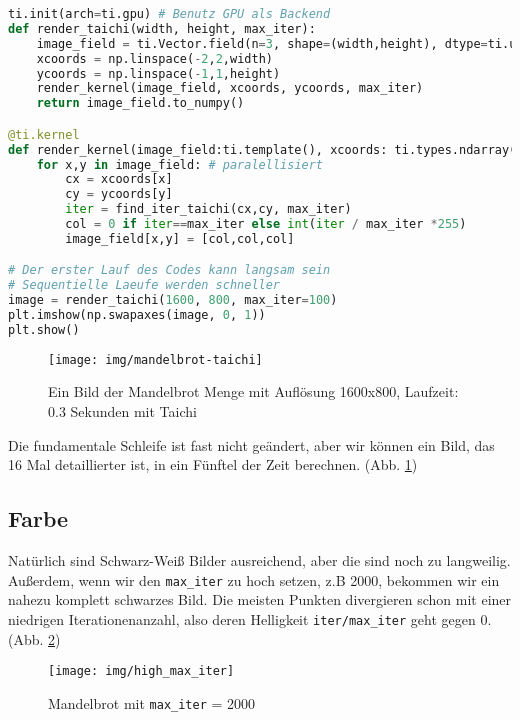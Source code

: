 \documentclass{article}
\begin{document}
\begin{lstlisting}[language=python]
ti.init(arch=ti.gpu) # Benutz GPU als Backend
def render_taichi(width, height, max_iter):
	image_field = ti.Vector.field(n=3, shape=(width,height), dtype=ti.uint32)
	xcoords = np.linspace(-2,2,width)
	ycoords = np.linspace(-1,1,height)
	render_kernel(image_field, xcoords, ycoords, max_iter)
	return image_field.to_numpy()

@ti.kernel
def render_kernel(image_field:ti.template(), xcoords: ti.types.ndarray(), ycoords: ti.types.ndarray(), max_iter: int): 
	for x,y in image_field: # paralellisiert
		cx = xcoords[x]
		cy = ycoords[y]
		iter = find_iter_taichi(cx,cy, max_iter)
		col = 0 if iter==max_iter else int(iter / max_iter *255)
		image_field[x,y] = [col,col,col]

# Der erster Lauf des Codes kann langsam sein
# Sequentielle Laeufe werden schneller
image = render_taichi(1600, 800, max_iter=100)
plt.imshow(np.swapaxes(image, 0, 1))
plt.show()
\end{lstlisting}
\begin{figure}[!htb]
	\centering
	\texttt{[image: img/mandelbrot-taichi]}
	\caption{Ein Bild der Mandelbrot Menge mit Auflösung 1600x800, Laufzeit: 0.3 Sekunden mit Taichi}
	\label{fig:mandelbrot-taichi}
\end{figure}
Die fundamentale Schleife ist fast nicht geändert, aber wir können ein Bild, das 16 Mal detaillierter ist, in ein Fünftel der Zeit berechnen. (Abb. \ref{fig:mandelbrot-taichi})

\subsection{Farbe}
Natürlich sind Schwarz-Weiß Bilder ausreichend, aber die sind noch zu langweilig. Außerdem, wenn wir den \lstinline|max_iter| zu hoch setzen, z.B 2000, bekommen wir ein nahezu komplett schwarzes Bild. Die meisten Punkten divergieren schon mit einer niedrigen Iterationenanzahl, also deren Helligkeit \lstinline|iter/max_iter| geht gegen 0. (Abb. \ref{fig:highmaxiter})

\begin{figure}[!htb]
\centering
\texttt{[image: img/high\_max\_iter]}
\caption{Mandelbrot mit \lstinline|max_iter| = 2000}
\label{fig:highmaxiter}
\end{figure}
\end{document}
